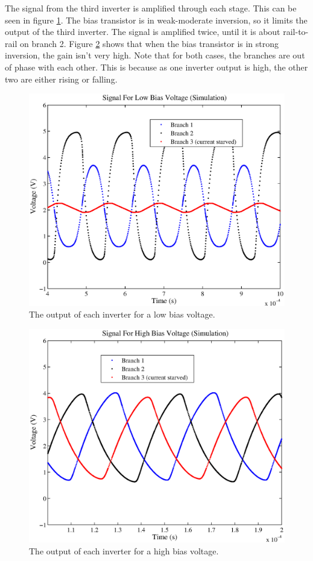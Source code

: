 \documentclass{article}
\begin{document}
The signal from the third inverter is amplified through each stage. This can be seen in figure \ref{lowBiasSigSim}. The bias transistor is in weak-moderate inversion, so it limits the output of the third inverter. The signal is amplified twice, until it is about rail-to-rail on branch 2. Figure \ref{highBiasSigSim} shows that when the bias transistor is in strong inversion, the gain isn't very high. Note that for both cases, the branches are out of phase with each other. This is because as one inverter output is high, the other two are either rising or falling. \\


\begin{figure}[H]
\centering
\includegraphics[scale=.7]{lowBiasSigSim.eps}
\caption{The output of each inverter for a low bias voltage.}
\label{lowBiasSigSim}
\end{figure}

\begin{figure}[H]
\centering
\includegraphics[scale=.7]{highBiasSigSim.eps}
\caption{The output of each inverter for a high bias voltage.}
\label{highBiasSigSim}
\end{figure}
\end{document}
